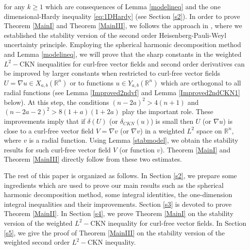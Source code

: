 \documentclass[a4paper,12pt]{article}
\theoremstyle{plain}
\theoremstyle{definition}
\theoremstyle{remark}
\def\R{\mathbb R}%
\numberwithin{equation}{section}
\begin{document}
for any $k\geq 1$ which are consequences of Lemma \ref{modelineq} and the one dimensional-Hardy inequality \eqref{eq:1DHardy} (see Section \ref{s2}). In order to prove Theorem \ref{MainI} and Theorem \ref{MainIII}, we follows the approach in \cite{DNCVPDE}, where we established the stability version of the second order Heisenberg-Pauli-Weyl uncertainty principle. Employing the spherical harmonic decomposition method and Lemma \ref{modelineq}, we will prove that the sharp constants in the weighted $L^2-$CKN inequalities for curl-free vector fields and second order derivatives can be improved by larger constants when restricted to curl-free vector fields $U = \nabla u\in X_{a,b}(\R^n)$ or to functions $u\in Y_{a,b}(\R^n)$ which are  orthogonal to all radial functions (see Lemma \ref{Improved2ndvf} and Lemma \ref{Improved2ndCKN1} below). At this step, the conditions $(n-2a)^2 > 4(n+1)$ and $(n-2a-2)^2 > 8(1+a)(1+2a)$ play the important role. These improvements imply that if $\delta(U)$ (or $\delta_{CKN}(u)$) is small then $U$ (or $\nabla u$) is close to a curl-free vector field { $V =\nabla v$ (or $\nabla v$)} in a weighted $L^2$ space on $\R^n$, where $v$ is a radial function. Using Lemma \ref{stabmodel}, we obtain the stability results for such curl-free vector field $V$ (or function $v$). Theorem \ref{MainI} and Theorem \ref{MainIII} directly follow from these two estimates.


The rest of this paper is organized as follows. In Section \ref{s2}, we prepare some ingredients which are used to prove our main results such as the spherical harmonic decomposition method, some integral identities, the one-dimension integral inequalities and their improvements. Section \ref{s3} is devoted to prove Theorem \ref{MainII}. In Section \ref{s4}, we prove Theorem \ref{MainI} on the stability version of the weighted $L^2-$CKN inequality for curl-free vector fields. In  Section \ref{s5}, we give the proof of Theorem \ref{MainIII} on the stability version of the weighted second order $L^2-$CKN inequality.
\end{document}
